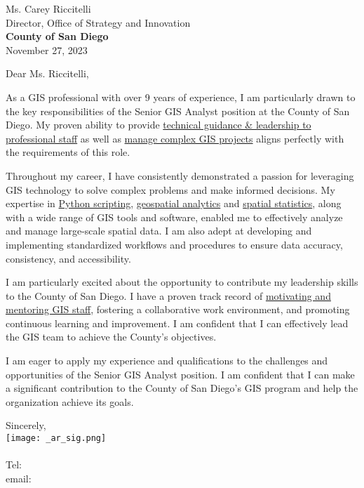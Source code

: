 \documentclass[letterpaper]{article}
\newcommand{\impt}[1]{\uline{#1}}
\newcommand{\CVcompany}{County of San Diego}
\begin{document}
\large
Ms. Carey Riccitelli \\
Director, Office of Strategy and Innovation \\
\textbf{\CVcompany} \\

\null\hfill November 27, 2023

Dear Ms. Riccitelli,

As a GIS professional with over 9 years of experience, I am
particularly drawn to the key responsibilities of the Senior GIS Analyst
position at the County of San Diego. My proven ability to provide
\impt{technical guidance \& leadership to professional staff}
as well as \impt{manage complex GIS projects}
aligns perfectly with the requirements of this
role.

Throughout my career, I have consistently demonstrated a passion for leveraging
GIS technology to solve complex problems and make informed decisions. My
expertise in
\impt{Python scripting},
\impt{geospatial analytics} and
\impt{spatial statistics},
along with a wide range of GIS tools and software,
enabled me to effectively analyze and manage large-scale spatial data. I am
also adept at developing and implementing standardized workflows and procedures
to ensure data accuracy, consistency, and accessibility.

I am particularly excited about the opportunity to contribute my leadership
skills to the County of San Diego. I have a proven track record of
\impt{motivating and mentoring GIS staff},
fostering a collaborative work environment, and
promoting continuous learning and improvement. I am confident that I can
effectively lead the GIS team to achieve the County's objectives.

I am eager to apply my experience and qualifications to the challenges and
opportunities of the Senior GIS Analyst position. I am confident that I can
make a significant contribution to the County of San Diego's GIS program and
help the organization achieve its goals.

Sincerely,\\
    \hspace{1em}
    \texttt{[image: \_ar\_sig.png]} \\
    \CVsigname \\
    \small
    Tel: \CVphone \\
    email: \CVemail
\end{document}
